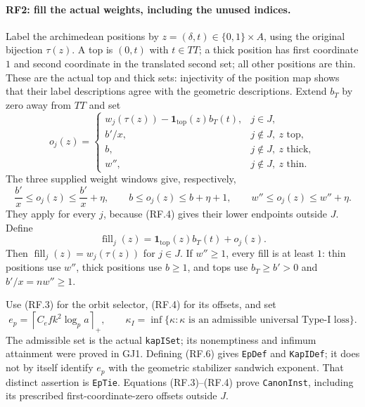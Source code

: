 \documentclass[11pt,a4paper]{article}
\numberwithin{equation}{section}
\theoremstyle{remark}\newtheorem{remark}[theorem]{Remark}
\begin{document}
\paragraph{RF2: fill the actual weights, including the unused indices.}
Label the archimedean positions by $z=(\delta,t)\in\{0,1\}\times A$,
using the original bijection $\tau(z)$. A top is $(0,t)$ with
$t\in TT$; a thick position has first coordinate $1$ and second
coordinate in the translated second set; all other positions are thin.
These are the actual top and thick sets: injectivity of the position map
shows that their label descriptions agree with the geometric descriptions.
Extend $b_T$ by zero away from $TT$ and set
\[
 o_j(z)=
 \begin{cases}
 w_j(\tau(z))-\mathbf1_{\mathrm{top}}(z)b_T(t),&j\in J,\\
 b'/x,&j\notin J,\ z\text{ top},\\
 b,&j\notin J,\ z\text{ thick},\\
 w'',&j\notin J,\ z\text{ thin}.
 \end{cases}                                                  \tag{RF.4}
\]
The three supplied weight windows give, respectively,
\[
 \frac{b'}x\leq o_j(z)\leq\frac{b'}x+\eta,\qquad
 b\leq o_j(z)\leq b+\eta+1,\qquad
 w''\leq o_j(z)\leq w''+\eta.                                 \tag{RF.5}
\]
They apply for every $j$, because (RF.4) gives their lower endpoints
outside $J$. Define
\[
 \operatorname{fill}_j(z)=\mathbf1_{\mathrm{top}}(z)b_T(t)+o_j(z).
\]
Then $\operatorname{fill}_j(z)=w_j(\tau(z))$ for $j\in J$.
If $w''\geq1$, every fill is at least $1$: thin positions use $w''$,
thick positions use $b\geq1$, and tops use $b_T\geq b'>0$ and
$b'/x=nw''\geq1$.

Use (RF.3) for the orbit selector, (RF.4) for its offsets, and set
\[
 e_p=\left\lceil C_e f k^2\log_p a\right\rceil_+,
 \qquad \kappa_I=\inf\{\kappa:\kappa\text{ is an admissible
                            universal Type-I loss}\}.         \tag{RF.6}
\]
The admissible set is the actual \texttt{kapISet}; its nonemptiness and
infimum attainment were proved in GJ1. Defining (RF.6) gives
\texttt{EpDef} and \texttt{KapIDef}; it does not by itself identify $e_p$
with the geometric stabilizer sandwich exponent. That distinct assertion
is \texttt{EpTie}. Equations (RF.3)--(RF.4) prove \texttt{CanonInst},
including its prescribed first-coordinate-zero offsets outside $J$.
\end{document}

